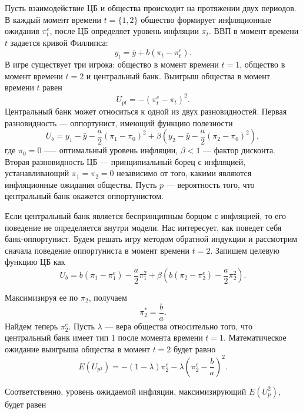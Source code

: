 \documentclass[14pt,a4paper, oneside]{extreport}
\theoremstyle{plain}              %
\theoremstyle{definition}         %
\begin{document}
Пусть взаимодействие ЦБ и общества происходит на протяжении двух периодов. В каждый момент времени $t = \{1,2\}$ общество формирует инфляционные ожидания $\pi_t^e$, после ЦБ определяет уровень инфляции $\pi_t$. ВВП в момент времени $t$ задается
кривой Филлипса:
\begin{equation}
y_t = \bar{y} +b(\pi_t-\pi_t^e). 
\end{equation}
В игре существует три игрока: общество в момент времени $t = 1$, общество в момент времени
$t = 2$ и центральный банк. Выигрыш общества в момент времени $t$ равен
\begin{equation}
U_{pt}=-(\pi_t^e-\pi_t)^2.
\end{equation}
Центральный банк может относиться к одной из двух разновидностей. Первая разновидность — оппортунист, имеющий функцию полезности
\begin{equation}
U_b = y_1 - \bar y - \frac{a}{2} (\pi_1 - \pi_0)^2 + \beta (y_2 - \bar y - \frac{a}{2} (\pi_2 - \pi_0)^2),
\end{equation}
 где $\pi_0=0$ --— оптимальный уровень инфляции, $\beta <1$ --- фактор дисконта. Вторая разновидность ЦБ — принципиальный борец с инфляцией, устанавливающий
$\pi_1=\pi_2=0$ независимо от того, какими являются инфляционные ожидания общества. Пусть $p$ ---
вероятность того, что центральный банк окажется оппортунистом.

Если центральный банк является беспринципным борцом с инфляцией, то его поведение не
определяется внутри модели. Нас интересует, как поведет себя банк-оппортунист. Будем решать игру методом обратной индукции и рассмотрим
сначала поведение оппортуниста в момент времени $t = 2$. Запишем целевую функцию ЦБ
как
\begin{equation} 
U_b = b (\pi_1 - \pi_1^e) - \frac{a}{2} \pi_1^2 + \beta (b(\pi_2 - \pi_2^e) - \frac{a}{2} \pi_2^2). 
\end{equation}

Максимизируя ее по $\pi_2$, получаем
\begin{equation} 
\pi_2^* = \frac{b}{a}.
\end{equation}
Найдем теперь $\pi_2^e$. Пусть $\lambda$ --- вера общества относительно того, что центральный банк имеет тип $1$ после момента времени $t=1$. Математическое ожидание выигрыша общества в момент $t=2$ будет равно
\begin{equation}
E(U_{p^2}) = -(1-\lambda)\pi_2^e - \lambda (\pi_2^e - \frac{b}{a})^2. 
\end{equation}

Соответственно, уровень ожидаемой инфляции, максимизирующий $E(U_p^2)$, будет равен 
\end{document}
